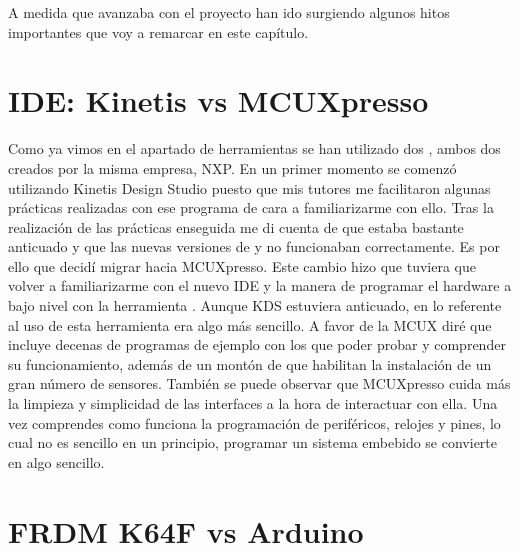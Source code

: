 
A medida que avanzaba con el proyecto han ido surgiendo algunos hitos importantes que voy a remarcar en este capítulo.

\section{IDE: Kinetis vs MCUXpresso}\label{sec:ARKinetisvsMCUX}
Como ya vimos en el apartado de herramientas se han utilizado dos , ambos dos creados por la misma empresa, NXP. 
En un primer momento se comenzó utilizando Kinetis Design Studio puesto que mis tutores me facilitaron algunas prácticas realizadas con ese programa de cara a familiarizarme con ello. Tras la realización de las prácticas enseguida me di cuenta de que estaba bastante anticuado y que las nuevas versiones de  y  no funcionaban correctamente.
Es por ello que decidí migrar hacia MCUXpresso. Este cambio hizo que tuviera que volver a familiarizarme con el nuevo IDE y la manera de programar el hardware a bajo nivel con la herramienta . Aunque KDS estuviera anticuado, en lo referente al uso de esta herramienta era algo más sencillo. A favor de la MCUX diré que incluye decenas de programas de ejemplo con los que poder probar y comprender su funcionamiento, además de un montón de  que habilitan la instalación de un gran número de sensores. También se puede observar que MCUXpresso cuida más la limpieza y simplicidad de las interfaces a la hora de interactuar con ella. Una vez comprendes como funciona la programación de periféricos, relojes y pines, lo cual no es sencillo en un principio, programar un sistema embebido se convierte en algo sencillo.

\section{FRDM K64F vs Arduino}\label{sec:ARK64FvsArduino}

